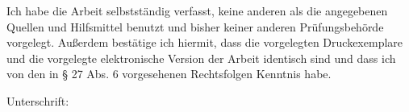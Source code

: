\documentclass[a4paper,12pt]{scrreprt}
\begin{document}
	\noindent Ich habe die Arbeit selbstständig verfasst, keine anderen als die angegebenen Quellen und Hilfsmittel benutzt und bisher keiner anderen Prüfungsbehörde vorgelegt. Außerdem bestätige ich hiermit, dass die vorgelegten Druckexemplare und die vorgelegte elektronische Version der Arbeit identisch sind und dass ich von den in § 27 Abs. 6 vorgesehenen Rechtsfolgen Kenntnis habe.\par\hfill\par\noindent
	Unterschrift:\hspace{0.5cm} \makebox[1.5in]{\hrulefill}
\end{document}
